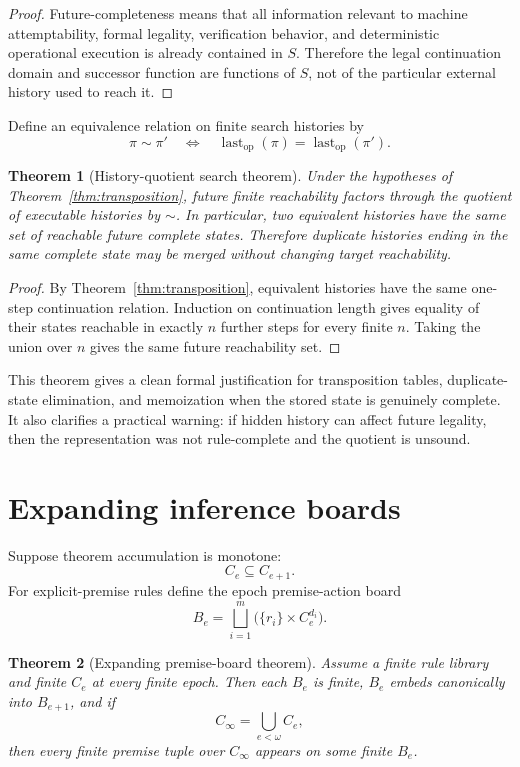 \documentclass[11pt]{article}
\newtheorem{theorem}{Theorem}[section]
\theoremstyle{definition}
\newcommand{\lastop}{\operatorname{last}_{\mathrm{op}}}
\begin{document}
\begin{proof}
Future-completeness means that all information relevant to machine attemptability, formal legality, verification behavior, and deterministic operational execution is already contained in $S$. Therefore the legal continuation domain and successor function are functions of $S$, not of the particular external history used to reach it.
\end{proof}

Define an equivalence relation on finite search histories by
\[
\pi\sim\pi'
\quad\Longleftrightarrow\quad
\lastop(\pi)=\lastop(\pi').
\]

\begin{theorem}[History-quotient search theorem]\label{thm:history-quotient}
Under the hypotheses of Theorem~\ref{thm:transposition}, future finite reachability factors through the quotient of executable histories by $\sim$. In particular, two equivalent histories have the same set of reachable future complete states. Therefore duplicate histories ending in the same complete state may be merged without changing target reachability.
\end{theorem}

\begin{proof}
By Theorem~\ref{thm:transposition}, equivalent histories have the same one-step continuation relation. Induction on continuation length gives equality of their states reachable in exactly $n$ further steps for every finite $n$. Taking the union over $n$ gives the same future reachability set.
\end{proof}

This theorem gives a clean formal justification for transposition tables, duplicate-state elimination, and memoization when the stored state is genuinely complete. It also clarifies a practical warning: if hidden history can affect future legality, then the representation was not rule-complete and the quotient is unsound.

\section{Expanding inference boards}

Suppose theorem accumulation is monotone:
\[
C_e\subseteq C_{e+1}.
\]
For explicit-premise rules define the epoch premise-action board
\[
B_e=
\bigsqcup_{i=1}^m
\bigl(\{r_i\}\times C_e^{d_i}\bigr).
\]

\begin{theorem}[Expanding premise-board theorem]\label{thm:expanding-board}
Assume a finite rule library and finite $C_e$ at every finite epoch. Then each $B_e$ is finite, $B_e$ embeds canonically into $B_{e+1}$, and if
\[
C_\infty=\bigcup_{e<\omega}C_e,
\]
then every finite premise tuple over $C_\infty$ appears on some finite $B_e$.
\end{theorem}
\end{document}
